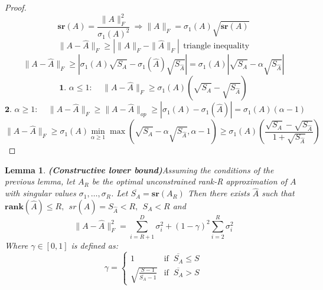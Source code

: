 \documentclass{article}
\newtheorem{lemma}{Lemma}
\begin{document}
            \begin{proof}

                \[ \mathbf{sr}(A) = \frac{\|A\|_F^2}{\sigma_1(A)^2} ~ \Longrightarrow \|A\|_F = \sigma_1(A) \sqrt{\mathbf{sr}(A)} \] 
                \[ \|A - \hat{A}\|_F \geqslant \left| \|A\|_F - \|\hat{A}\|_F \right| ~~ \text{triangle inequality}\]
                \[ \|A - \hat{A}\|_F \geqslant |\sigma_1(A)\sqrt{S_A} - \sigma_1(\hat{A})\sqrt{S_{\hat{A}}}| = \sigma_1(A)|\sqrt{S_A} - \alpha\sqrt{S_{\hat{A}}}| \]
                \[\textbf{1.  } \alpha \leq 1:  ~~~~~\|A - \hat{A}\|_F \geqslant \sigma_1(A)\left(\sqrt{S_A} - \sqrt{S_{\hat{A}}}\right)\]
                \[\textbf{2.  } \alpha \geq 1:  ~~~~~\|A - \hat{A}\|_F \geqslant \|A - \hat{A}\|_{op} \geqslant |\sigma_1(A) - \sigma_1(\hat{A})| = \sigma_1(A)(\alpha - 1)\]
                $$\|A - \hat{A}\|_F \geqslant \sigma_1(A)\min_{\alpha\geqslant 1}\max \left(\sqrt{S_A} - \alpha\sqrt{S_{\hat{A}}}, \alpha - 1\right)\geqslant \sigma_1(A)\left(\frac{\sqrt{S_A} - \sqrt{S_{\hat{A}}}}{1 + \sqrt{S_{\hat{A}}}}\right)$$
            \end{proof}

            \begin{lemma} \textbf{(Constructive lower bound)}\label{lemma:lemma2}
                Assuming the conditions of the previous lemma, let $A_R$ be the optimal unconstrained rank-R approximation of $A$ with singular values $\sigma_1, \dots, \sigma_R$. Let $\overline{S_A} = \mathbf{sr}(A_R)$
                Then there exists $\hat{A}$ such that  $\mathbf{rank}(\hat{A})\leqslant R, ~~sr(\hat{A}) = S_{\hat{A}} < R,~~ S_A < R$ and 
                $$\|A - \hat{A}\|_F^2 = \sum\limits_{i=R+1}^{D}\sigma_i^2 + (1 - \gamma)^2 \sum\limits_{i=2}^R\sigma_i^2$$ 
                Where $\gamma \in [0, 1]$ is defined as:
                $$ \gamma = \begin{cases} 1 & \text{if } ~ \overline{S_A} \leqslant S \\ \sqrt{\frac{S - 1}{\overline{S_A} - 1}} & \text{if } ~ \overline{S_A} > S \end{cases} $$
            \end{lemma}
\end{document}
